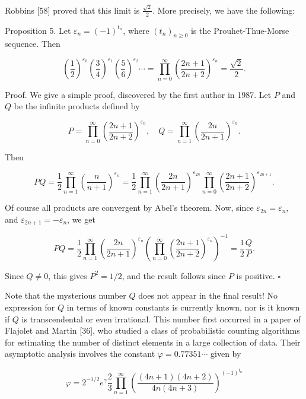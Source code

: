 \documentclass[10pt]{article}
\begin{document}
Robbins [58] proved that this limit is $\frac{\sqrt{2}}{2}$. More precisely, we have the following:

Proposition 5. Let $\varepsilon_{n}=(-1)^{t_{n}}$, where $\left(t_{n}\right)_{n \geq 0}$ is the Prouhet-Thue-Morse sequence. Then


\begin{equation*}
\left(\frac{1}{2}\right)^{\varepsilon_{0}}\left(\frac{3}{4}\right)^{\varepsilon_{1}}\left(\frac{5}{6}\right)^{\varepsilon_{2}} \cdots=\prod_{n=0}^{\infty}\left(\frac{2 n+1}{2 n+2}\right)^{\varepsilon_{n}}=\frac{\sqrt{2}}{2}. \tag{1}
\end{equation*}


Proof. We give a simple proof, discovered by the first author in 1987. Let $P$ and $Q$ be the infinite products defined by

\[
P=\prod_{n=0}^{\infty}\left(\frac{2 n+1}{2 n+2}\right)^{\varepsilon_{n}}, \quad Q=\prod_{n=1}^{\infty}\left(\frac{2 n}{2 n+1}\right)^{\varepsilon_{n}}.
\]

Then

\[
P Q=\frac{1}{2} \prod_{n=1}^{\infty}\left(\frac{n}{n+1}\right)^{\varepsilon_{n}}=\frac{1}{2} \prod_{n=1}^{\infty}\left(\frac{2 n}{2 n+1}\right)^{\varepsilon_{2 n}} \prod_{n=0}^{\infty}\left(\frac{2 n+1}{2 n+2}\right)^{\varepsilon_{2 n+1}}.
\]

Of course all products are convergent by Abel's theorem. Now, since $\varepsilon_{2 n}=\varepsilon_{n}$, and $\varepsilon_{2 n+1}=-\varepsilon_{n}$, we get

\[
P Q=\frac{1}{2} \prod_{n=1}^{\infty}\left(\frac{2 n}{2 n+1}\right)^{\varepsilon_{n}}\left(\prod_{n=0}^{\infty}\left(\frac{2 n+1}{2 n+2}\right)^{\varepsilon_{n}}\right)^{-1}=\frac{1}{2} \frac{Q}{P}.
\]

Since $Q \neq 0$, this gives $P^{2}=1 / 2$, and the result follows since $P$ is positive. \(\square\)

Note that the mysterious number $Q$ does not appear in the final result! No expression for $Q$ in terms of known constants is currently known, nor is it known if $Q$ is transcendental or even irrational. This number first occurred in a paper of Flajolet and Martin [36], who studied a class of probabilistic counting algorithms for estimating the number of distinct elements in a large collection of data. Their asymptotic analysis involves the constant $\varphi=0.77351\cdots$ given by

\[
\varphi=2^{-1 / 2} e^{\gamma} \frac{2}{3} \prod_{n=1}^{\infty}\left(\frac{(4 n+1)(4 n+2)}{4 n(4 n+3)}\right)^{(-1)^{t_{n}}}
\]
\end{document}
